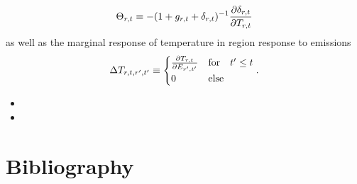 \documentclass[preprint,3p,authoryear]{elsarticle}
\begin{document}
\begin{equation}
  \label{eq:Theta}
  \Theta_{r,t}\equiv - (1+g_{r,t}+\delta_{r,t})^{-1}\frac{\partial\delta_{r,t}}{\partial T_{r,t}}
\end{equation}
as well as the marginal response of temperature in region response to emissions
\begin{equation}
  \label{eq:DeltaT}
  \Delta T_{r,t,r',t'}\equiv\begin{cases}
    \frac{\partial T_{r,t}}{\partial E_{r',t'}} & \text{for}\quad t'\leq t\\
    0 & \text{else}
  \end{cases}.
\end{equation}
\begin{itemize}
\item {}
\item {}
\end{itemize}
\section*{Bibliography}
%

\end{document}

